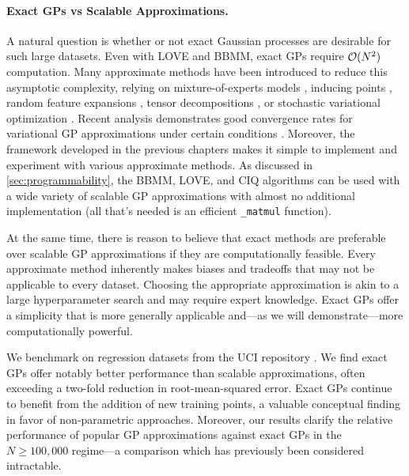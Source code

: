 \paragraph{Exact GPs vs Scalable Approximations.}
A natural question is whether or not exact Gaussian processes are desirable for such large datasets.
Even with LOVE and BBMM, exact GPs require $\bigo{N^2}$ computation.
Many approximate methods have been introduced to reduce this asymptotic complexity, relying on mixture-of-experts models \cite{deisenroth2015distributed}, inducing points \citep{snelson2006sparse,titsias2009variational,wilson2015kernel,gardner2018product},
random feature expansions \cite{rahimi2008random,le2013fastfood,yang2015carte},
tensor decompositions \cite{izmailov2018scalable,evans2018scalable},
or stochastic variational optimization \citep{hensman2013gaussian,hensman2015scalable,wilson2016stochastic,cheng2017variational,salimbeni2018orthogonally,shi2019sparse}.
Recent analysis demonstrates good convergence rates for variational GP approximations under certain conditions \cite{burt2019rates}.
Moreover, the framework developed in the previous chapters makes it simple to implement and experiment with various approximate methods.
As discussed in \cref{sec:programmability}, the BBMM, LOVE, and CIQ algorithms can be used with a wide variety of scalable GP approximations with almost no additional implementation
(all that's needed is an efficient {\tt \_matmul} function).

At the same time, there is reason to believe that exact methods are preferable over scalable GP approximations if they are computationally feasible.
Every approximate method inherently makes biases and tradeoffs \cite{turner2011two,bauer2016understanding} that may not be applicable to every dataset.
Choosing the appropriate approximation is akin to a large hyperparameter search and may require expert knowledge.
Exact GPs offer a simplicity that is more generally applicable and---as we will demonstrate---more computationally powerful.

We benchmark on regression datasets from the UCI repository \citep{asuncion2007uci}.
We find exact GPs offer notably better performance than scalable approximations, often exceeding a two-fold reduction in root-mean-squared error.
Exact GPs continue to benefit from the addition of new training points, a valuable conceptual finding in favor of non-parametric approaches.
Moreover, our results clarify the relative performance of popular GP approximations against exact GPs in the $N\geq100,\!000$ regime---a comparison which has previously been considered intractable.

